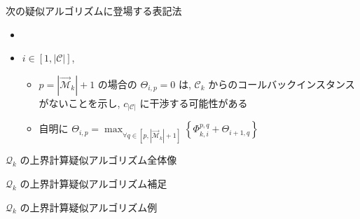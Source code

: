 \begin{frame}{次の疑似アルゴリズムに登場する表記法}
    \begin{itemize}
        \item {}
        \item $i \in[1,|\mathcal{C}|]$, 
        \begin{itemize}
            \item $p=\left|\overrightarrow{\mathcal{M}}_{k}\right|+1$ の場合の $\Theta_{i, p}=0$ は, $\mathcal{C}_{k}$ からのコールバックインスタンスがないことを示し, $c_{|\mathcal{C}|}$ に干渉する可能性がある
            \item 自明に $\Theta_{i, p}=\max _{\forall q \in\left[p,\left|\overrightarrow{\mathcal{M}}_{k}\right|+1\right]}\left\{\Phi_{k, i}^{p, q}+\Theta_{i+1, q}\right\}$
        \end{itemize}
    \end{itemize}
\end{frame}

\begin{frame}{$\mathcal{Q}_k$ の上界計算疑似アルゴリズム全体像}
\end{frame}

\begin{frame}{$\mathcal{Q}_k$ の上界計算疑似アルゴリズム補足}
\end{frame}

\begin{frame}{$\mathcal{Q}_k$ の上界計算疑似アルゴリズム例}
\end{frame}

